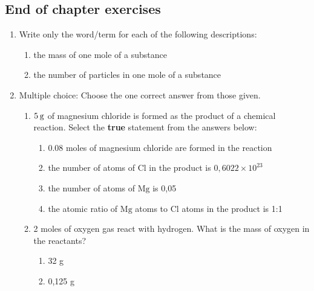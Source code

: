             \subsection{ End of chapter exercises}
            \nopagebreak
      \label{m38712*id286171}\begin{enumerate}[noitemsep, label=\textbf{\arabic*}. ] 
            \label{m38712*uid123}\item Write only the word/term for each of the following descriptions:
\label{m38712*id286187}\begin{enumerate}[noitemsep, label=\textbf{\alph*}. ] 
            \label{m38712*uid124}\item the mass of one mole of a substance
\label{m38712*uid125}\item the number of particles in one mole of a substance
\end{enumerate}
                \label{m38712*uid126}\item Multiple choice: Choose the one correct answer from those given.
\label{m38712*id286228}\begin{enumerate}[noitemsep, label=\textbf{\alph*}. ] 
            \label{m38712*uid127}\item $5\phantom{\rule{2pt}{0ex}}\mathrm{g}$ of magnesium chloride is formed as the product of a chemical reaction. Select the \textbf{true} statement from the answers below:
\label{m38712*id286251}\begin{enumerate}[noitemsep, label=\textbf{\alph*}. ] 
            \label{m38712*uid128}\item 0.08 moles of magnesium chloride are formed in the reaction
\label{m38712*uid129}\item the number of atoms of $\mathrm{Cl}$ in the product is $0,6022\ensuremath{\times}{10}^{23}$\label{m38712*uid130}\item the number of atoms of $\mathrm{Mg}$ is 0,05
\label{m38712*uid131}\item the atomic ratio of $\mathrm{Mg}$ atoms to $\mathrm{Cl}$ atoms in the product is 1:1
\end{enumerate}
                \label{m38712*uid132}\item 2 moles of oxygen gas react with hydrogen. What is the mass of oxygen in the reactants?
\label{m38712*id286339}\begin{enumerate}[noitemsep, label=\textbf{\alph*}. ] 
            \label{m38712*uid133}\item 32 g
\label{m38712*uid134}\item 0,125 g

\end{enumerate}
\end{enumerate}
\end{enumerate}
